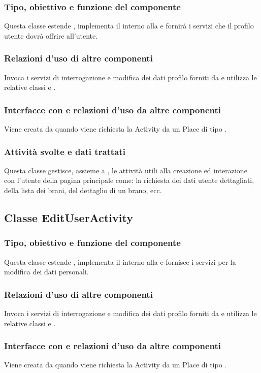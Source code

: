 \subsubsection*{Tipo, obiettivo e funzione del componente}
Questa classe estende , implementa il 
interno alla  e fornir\`a i servizi
che il profilo utente dovr\`a offrire all'utente.
\subsubsection*{Relazioni d'uso di altre componenti}
Invoca i servizi di interrogazione e modifica dei dati profilo forniti da
 e utilizza le relative classi  e
.
\subsubsection*{Interfacce con e relazioni d'uso da altre componenti}
Viene creata da  quando viene richiesta la Activity da
un Place di tipo .
\subsubsection*{Attivit\`a svolte e dati trattati}
Questa classe gestisce, assieme a , le attivit\`a utili alla
creazione ed interazione con l'utente della pagina principale come: la
richiesta dei dati utente dettagliati, della lista dei brani, del dettaglio di
un brano, ecc.

\subsection{Classe EditUserActivity}
\subsubsection*{Tipo, obiettivo e funzione del componente}
Questa classe estende , implementa il 
interno alla  e fornisce i servizi per la modifica dei dati
personali.
\subsubsection*{Relazioni d'uso di altre componenti}
Invoca i servizi di interrogazione e modifica dei dati profilo forniti da
 e utilizza le relative classi  e
.
\subsubsection*{Interfacce con e relazioni d'uso da altre componenti}
Viene creata da  quando viene richiesta la Activity da
un Place di tipo .
